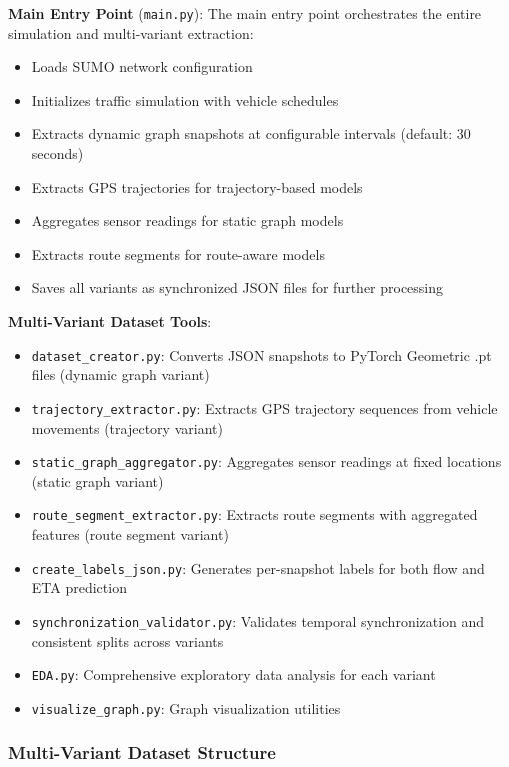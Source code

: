 \textbf{Main Entry Point} (\texttt{main.py}):
The main entry point orchestrates the entire simulation and multi-variant extraction:
\begin{itemize}
    \item Loads SUMO network configuration
    \item Initializes traffic simulation with vehicle schedules
    \item Extracts dynamic graph snapshots at configurable intervals (default: 30 seconds)
    \item Extracts GPS trajectories for trajectory-based models
    \item Aggregates sensor readings for static graph models
    \item Extracts route segments for route-aware models
    \item Saves all variants as synchronized JSON files for further processing
\end{itemize}

\textbf{Multi-Variant Dataset Tools}:
\begin{itemize}
    \item \texttt{dataset\_creator.py}: Converts JSON snapshots to PyTorch Geometric .pt files (dynamic graph variant)
    \item \texttt{trajectory\_extractor.py}: Extracts GPS trajectory sequences from vehicle movements (trajectory variant)
    \item \texttt{static\_graph\_aggregator.py}: Aggregates sensor readings at fixed locations (static graph variant)
    \item \texttt{route\_segment\_extractor.py}: Extracts route segments with aggregated features (route segment variant)
    \item \texttt{create\_labels\_json.py}: Generates per-snapshot labels for both flow and ETA prediction
    \item \texttt{synchronization\_validator.py}: Validates temporal synchronization and consistent splits across variants
    \item \texttt{EDA.py}: Comprehensive exploratory data analysis for each variant
    \item \texttt{visualize\_graph.py}: Graph visualization utilities
\end{itemize}

\subsubsection{Multi-Variant Dataset Structure}

